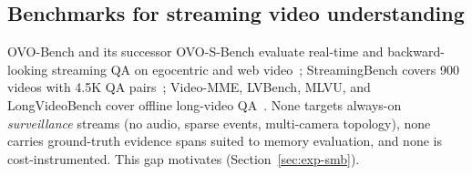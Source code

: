 \subsection{Benchmarks for streaming video understanding}
\label{sec:related-bench}

OVO-Bench and its successor OVO-S-Bench evaluate real-time and backward-looking streaming QA on egocentric and web video~\cite{ovobench,ovosbench}; StreamingBench covers 900 videos with 4.5K QA pairs~\cite{streamingbench}; Video-MME, LVBench, MLVU, and LongVideoBench cover offline long-video QA~\cite{videomme,lvbench,mlvu,longvideobench}. None targets always-on \emph{surveillance} streams (no audio, sparse events, multi-camera topology), none carries ground-truth evidence spans suited to memory evaluation, and none is cost-instrumented. This gap motivates \smb (Section~\ref{sec:exp-smb}).
